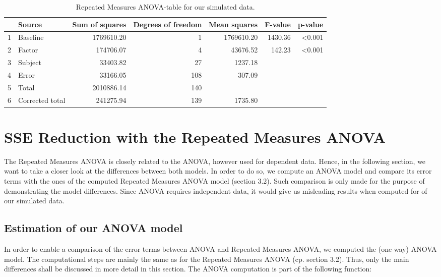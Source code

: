 \documentclass[11pt]{article}
\begin{document}
\begin{table}[ht]
\centering
\begin{tabular}{rlrrrrr}
  \hline
 & Source & Sum of squares & Degrees of freedom & Mean squares & F-value & p-value \\ 
  \hline
1 & Baseline & 1769610.20 & 1 & 1769610.20 & 1430.36 & <0.001 \\ 
  2 & Factor & 174706.07 & 4 & 43676.52 & 142.23 & <0.001 \\ 
  3 & Subject & 33403.82 & 27 & 1237.18 &  &  \\ 
  4 & Error & 33166.05 & 108 & 307.09 &  &  \\ 
  5 & Total & 2010886.14 & 140 &  &  &  \\ 
  6 & Corrected total & 241275.94 & 139 & 1735.80 &  &  \\ 
   \hline
\end{tabular}
\caption{Repeated Measures ANOVA-table for our simulated data.}\label{table:outputtable1}
\end{table}

    
	
	
	
		
	\section{SSE Reduction with the Repeated Measures ANOVA}
					The Repeated Measures ANOVA is closely related to the ANOVA, however used for dependent data. Hence, in the following section, we want to take a closer look at the differences between both models. In order to do so, we compute an ANOVA model and compare its error terms with the ones of the computed Repeated Measures ANOVA model (section 3.2).	Such comparison is only made for the purpose of demonstrating the model differences. Since ANOVA requires independent data, it would give us misleading results when computed for of our simulated data.\\
	
	
	
		\subsection{Estimation of our ANOVA model}
					In order to enable a comparison of the error terms between ANOVA and Repeated Measures ANOVA, we computed the (one-way) ANOVA model. The computational steps are mainly the same as for the Repeated Measures ANOVA (cp. section 3.2). Thus, only the main differences shall be discussed in more detail in this section. The ANOVA computation is part of the following function:\\
					
\end{document}
